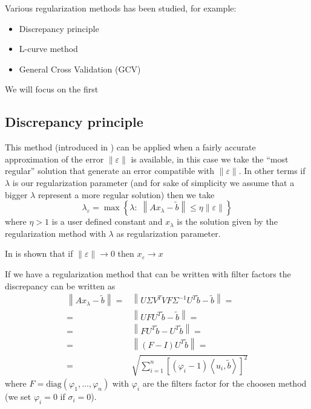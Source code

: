 \documentclass[a4paper,10pt]{article}
\theoremstyle{plain}
\theoremstyle{definition}
\theoremstyle{remark}
\newcommand{\set}[1]{\left\{#1\right\}}
\newcommand{\pa}[1]{\left(#1\right)}
\newcommand{\ang}[1]{\left<#1\right>}
\newcommand{\bra}[1]{\left[#1\right]}
\newcommand{\norm}[1]{\left\|#1\right\|}
\begin{document}
Various regularization methods has been studied, for example:
\begin{itemize}
\item Discrepancy principle
\item L-curve method
\item General Cross Validation (GCV)
\end{itemize}

We will focus on the first

\subsection{Discrepancy principle}

This method (introduced in \cite{discreporig}) can be applied when a
fairly accurate approximation of the error $\norm{\varepsilon}$ is
available, in this case we take the ``most regular'' solution that
generate an error compatible with $\norm{\varepsilon}$. In other terms
if $\lambda$ is our regularization parameter (and for sake of
simplicity we assume that a bigger $\lambda$ represent a more regular
solution) then we take
\begin{equation}
  \label{eq:discrepancygen}
  \lambda _\varepsilon = \max \set { \lambda :\; \norm{ Ax_\lambda -
      \tilde b} \le \eta \norm{\varepsilon}} 
\end{equation}
where $\eta > 1$ is a user defined constant and $x_\lambda$ is the
solution given by the regularization method with $\lambda$ as
regularization parameter.

In \cite{discrepbook} is shown that if $\norm{\varepsilon} \to 0$ then
$x _\varepsilon \to x$

If we have a regularization method that can be written with filter
factors the discrepancy can be written as
\begin{align*}
  \norm{ Ax_\lambda - \tilde b } =& \norm{ U \Sigma V^T V F \Sigma
    ^{-1} U^T \tilde b - \tilde b} =\\
  =& \norm { U F U^T \tilde b - \tilde b} =\\
  = & \norm{ F U^T \tilde b - U^T \tilde b } =\\
  =& \norm{ \pa{F-I} U^T \tilde b} =\\
  =& \sqrt{\sum _{i=1} ^n \bra{ \pa{ \varphi _i -1} \ang{ u_i, \tilde b} } ^2}
\end{align*}
where $F = \mathrm{diag}\pa{ \varphi _1 ,... , \varphi _n}$ with
$\varphi _i$ are the filters factor for the choosen method (we set
$\varphi _i = 0$ if $\sigma _i = 0$).
\end{document}
